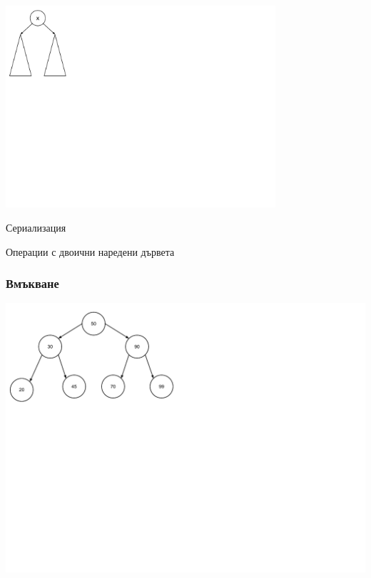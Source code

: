 \documentclass{beamer}
\begin{document}
\begin{frame}
\begin{center}
   \includegraphics[width=10cm]{images/tree_recursive}
\end{center}

\vspace{-200px}
\centerline{Сериализация}
 

\end{frame} 


\begin{frame}
\centerline{Операции с двоични наредени дървета}
\end{frame}


\begin{frame}[fragile]
\frametitle{Вмъкване}

\includegraphics[width=14cm]{images/tree_bot_clean}

\end{frame}
\end{document}
